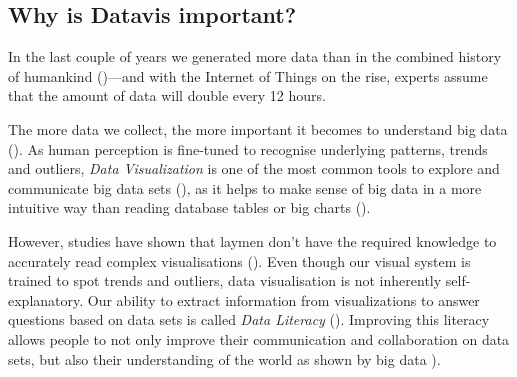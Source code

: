 
\subsection{Why is Datavis important?}


In the last couple of years we generated more data than in the combined history of humankind (\cite{helbing2019will})---and with the Internet of Things on the rise, experts assume that the amount of data will double every 12 hours.

The more data we collect, %
the more important it becomes to understand big data (\cite{borner2019}). As human perception is fine-tuned to recognise underlying patterns, trends and outliers, \emph{Data Visualization} is one of the most common tools to explore and communicate big data sets (\cite{heer2010}), as it helps to make sense of big data in a more intuitive way than reading database tables or big charts (\cite{donalek2014}).

However, studies have shown that laymen don't have the required knowledge to accurately read complex visualisations (\cite{borner2016}). %
Even though our visual system is trained to spot trends and outliers, data visualisation is not inherently self-explanatory. Our ability to extract information from visualizations to answer questions based on data sets is called \emph{Data Literacy} (\cite{boy2014}). Improving this literacy allows people to not only improve their communication and collaboration on data sets, but also their understanding of the world as shown by big data \cite{borner2019}). 
